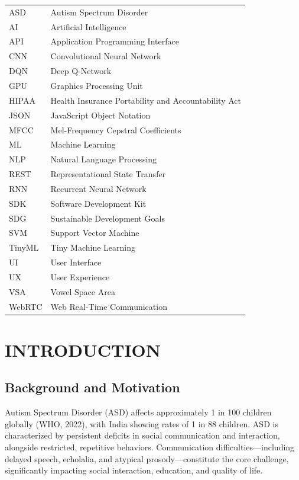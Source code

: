 \documentclass[12pt,a4paper]{article}
\begin{document}
\begin{tabular}{ll}
ASD & Autism Spectrum Disorder \\
AI & Artificial Intelligence \\
API & Application Programming Interface \\
CNN & Convolutional Neural Network \\
DQN & Deep Q-Network \\
GPU & Graphics Processing Unit \\
HIPAA & Health Insurance Portability and Accountability Act \\
JSON & JavaScript Object Notation \\
MFCC & Mel-Frequency Cepstral Coefficients \\
ML & Machine Learning \\
NLP & Natural Language Processing \\
REST & Representational State Transfer \\
RNN & Recurrent Neural Network \\
SDK & Software Development Kit \\
SDG & Sustainable Development Goals \\
SVM & Support Vector Machine \\
TinyML & Tiny Machine Learning \\
UI & User Interface \\
UX & User Experience \\
VSA & Vowel Space Area \\
WebRTC & Web Real-Time Communication \\
\end{tabular}

\newpage
{}
\setcounter{page}{1}

\section{INTRODUCTION}

\subsection{Background and Motivation}

Autism Spectrum Disorder (ASD) affects approximately 1 in 100 children globally (WHO, 2022), with India showing rates of 1 in 88 children. ASD is characterized by persistent deficits in social communication and interaction, alongside restricted, repetitive behaviors. Communication difficulties—including delayed speech, echolalia, and atypical prosody—constitute the core challenge, significantly impacting social interaction, education, and quality of life.
\end{document}
